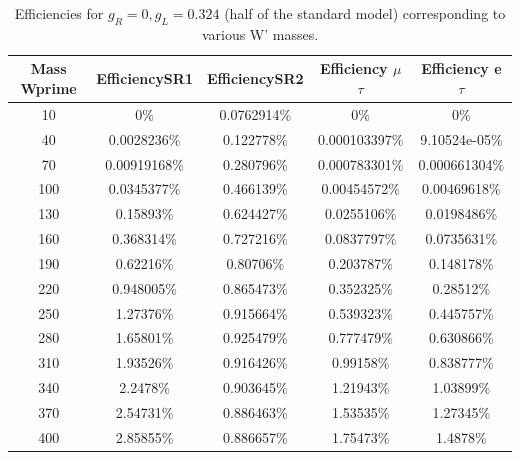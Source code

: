\begin{table}[htb]
  \centering
  \begin{tabular}{|ccccc|}
    \hline 
    Mass Wprime  & EfficiencySR1  & EfficiencySR2 & Efficiency $\mu$$\tau$ & Efficiency e $\tau$ \\
    \hline 
    10& 0\%        & 0.0762914\%& 0\%         & 0\%\\
    40& 0.0028236\%& 0.122778\%& 0.000103397\%& 9.10524e-05\%\\
    70& 0.00919168\%& 0.280796\%& 0.000783301\%& 0.000661304\%\\
    100& 0.0345377\%& 0.466139\%& 0.00454572\%& 0.00469618\%\\
    130& 0.15893\%& 0.624427\%& 0.0255106\%& 0.0198486\%\\
    160& 0.368314\%& 0.727216\%& 0.0837797\%& 0.0735631\%\\ 
    190& 0.62216\%& 0.80706\%& 0.203787\%& 0.148178\%\\
    220& 0.948005\%& 0.865473\%& 0.352325\%& 0.28512\%\\
    250& 1.27376\%& 0.915664\%& 0.539323\%& 0.445757\%\\ 
    280& 1.65801\%& 0.925479\%& 0.777479\%& 0.630866\%\\ 
    310& 1.93526\%& 0.916426\%& 0.99158\%& 0.838777\%\\ 
    340& 2.2478\%& 0.903645\%& 1.21943\%& 1.03899\%\\ 
    370& 2.54731\%& 0.886463\%& 1.53535\%& 1.27345\%\\ 
    400& 2.85855\%& 0.886657\%& 1.75473\%& 1.4878\%\\
    \hline
  \end{tabular}
  \caption{Efficiencies for $ g_R=0 , g_L=0.324 $ (half of the standard model) corresponding to various W' masses. \label{eff-half} }
\end{table}


